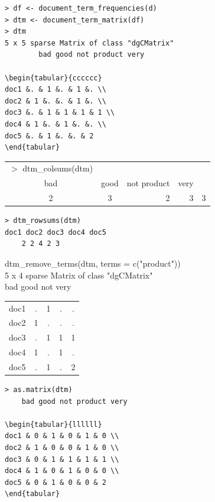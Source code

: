 \documentclass[10pt]{book}
\begin{document}
\begin{verbatim}
> df <- document_term_frequencies(d)
> dtm <- document_term_matrix(df)
> dtm
5 x 5 sparse Matrix of class "dgCMatrix"
        bad good not product very

\begin{tabular}{cccccc} 
doc1 &. & 1 &. & 1 &. \\
doc2 & 1 &. &. & 1 &. \\
doc3 &. & 1 & 1 & 1 & 1 \\
doc4 & 1 &. & 1 &. &. \\
doc5 &. & 1 &. &. & 2
\end{tabular}
\end{verbatim}

\begin{center}
\begin{tabular}{ccrrr}
$>$ dtm\_colsums(dtm) &  &  &  &  \\
bad & good & not product & very &  \\
2 & 3 & 2 & 3 & 3 \\
\end{tabular}
\end{center}

\begin{verbatim}
> dtm_rowsums(dtm)
doc1 doc2 doc3 doc4 doc5
    2 2 4 2 3
\end{verbatim}

\begin{displayquote}
dtm\_remove\_terms(dtm, terms = c("product"))\\
5 x 4 sparse Matrix of class "dgCMatrix"\\
bad good not very
\end{displayquote}

\begin{center}
\begin{tabular}{lcccc}
doc1 & . & 1 & . & . \\
doc2 & 1 & . & . & . \\
doc3 & . & 1 & 1 & 1 \\
doc4 & 1 & . & 1 & . \\
doc5 & . & 1 & . & 2 \\
\end{tabular}
\end{center}

\begin{verbatim}
> as.matrix(dtm)
    bad good not product very

\begin{tabular}{llllll} 
doc1 & 0 & 1 & 0 & 1 & 0 \\
doc2 & 1 & 0 & 0 & 1 & 0 \\
doc3 & 0 & 1 & 1 & 1 & 1 \\
doc4 & 1 & 0 & 1 & 0 & 0 \\
doc5 & 0 & 1 & 0 & 0 & 2
\end{tabular}
\end{verbatim}
\end{document}
